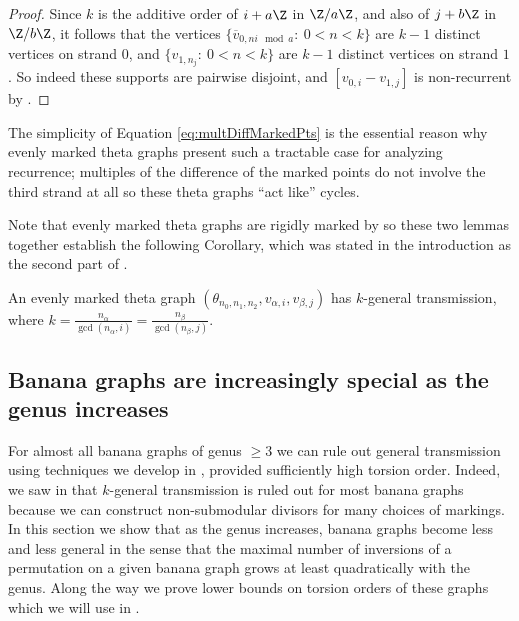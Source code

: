 \begin{proof}
Since $k$ is the additive order of $i + a \Z$ in $\Z / a \Z$, and also of $j + b \Z$ in $\Z / b \Z$, it follows that the vertices $\{ \overline{v}_{0, ni \mod a}:\ 0 < n < k \}$ are $k-1$ distinct vertices on strand $0$, and $\{ v_{1,n_j}:\ 0 < n < k \}$ are $k-1$ distinct vertices on strand $1$. So indeed these supports are pairwise disjoint, and $[v_{0,i} - v_{1,j}]$ is non-recurrent by .
\end{proof}

\begin{rema}
The simplicity of Equation \eqref{eq:multDiffMarkedPts} is the essential reason why evenly marked theta graphs present such a tractable case for analyzing recurrence; multiples of the difference of the marked points do not involve the third strand at all so these theta graphs ``act like'' cycles.
\end{rema}

Note that evenly marked theta graphs are rigidly marked by  so these two lemmas together establish the following Corollary, which was stated in the introduction as the second part of .

\begin{coro}\label{cor:evenlyMarkedKGT}
An evenly marked theta graph $(\theta_{n_0,n_1,n_2}, v_{\alpha,i}, v_{\beta,j})$  has $k$-general transmission, where $k = \frac{n_\alpha}{\gcd(n_\alpha, i)} = \frac{n_\beta}{\gcd(n_\beta, j)} $.
\end{coro}



\subsection{Banana graphs are increasingly special as the genus increases}\label{ssec:mostBananas}

For almost all banana graphs of genus $\geq 3$ we can rule out general transmission using techniques we develop in , provided sufficiently high torsion order. Indeed, we saw in  that $k$-general transmission is ruled out for most banana graphs because we can construct non-submodular divisors for many choices of markings.  In this section we show that as the genus increases, banana graphs become less and less general in the sense that the maximal number of inversions of a permutation on a given banana graph grows at least quadratically with the genus. Along the way we prove lower bounds on torsion orders of these graphs which we will use in .

